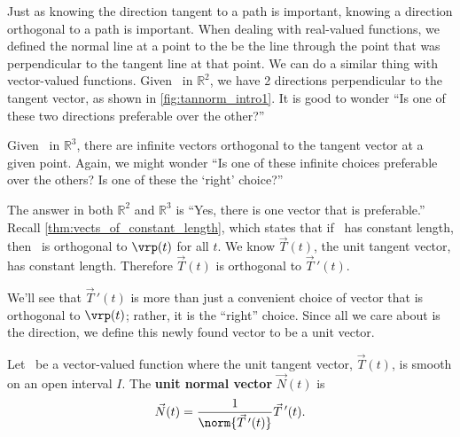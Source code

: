 Just as knowing the direction tangent to a path is important, knowing a direction orthogonal to a path is important. When dealing with real-valued functions, we defined the normal line at a point to the be the line through the point that was perpendicular to the tangent line at that point. We can do a similar thing with vector-valued functions. Given \vrt\ in $\mathbb{R}^2$, we have 2 directions perpendicular to the tangent vector, as shown in \autoref{fig:tannorm_intro1}. It is good to wonder ``Is one of these two directions preferable over the other?''

Given \vrt\ in $\mathbb{R}^3$,  there are infinite vectors orthogonal to the tangent vector at a given point. Again, we might wonder ``Is one of these infinite choices preferable over the others? Is one of these the `right' choice?''

The answer in both $\mathbb{R}^2$ and $\mathbb{R}^3$ is ``Yes, there is one vector that is preferable.'' %
Recall \autoref{thm:vects_of_constant_length}, which states that if \vrt\ has constant length, then \vrt\ is orthogonal to $\vrp(t)$ for all $t$. We know $\vec T(t)$, the unit tangent vector, has constant length. Therefore $\vec T(t)$ is orthogonal to $\vec T\,'(t)$.

We'll see that $\vec T\,'(t)$ is more than just a convenient choice of vector that is orthogonal to $\vrp(t)$; rather, it is the ``right'' choice. Since all we care about is the direction, we define this newly found vector to be a unit vector.


\begin{definition}\label{def:unit_normal}
Let \vrt\ be a vector-valued function where the unit tangent vector, $\vec T(t)$, is smooth on an open interval $I$. The \textbf{unit normal vector} $\vec N(t)$ is
\[\vec N(t) = \frac1{\norm{\vec T\,'(t)}}\vec T\,'(t).\]
\end{definition}

